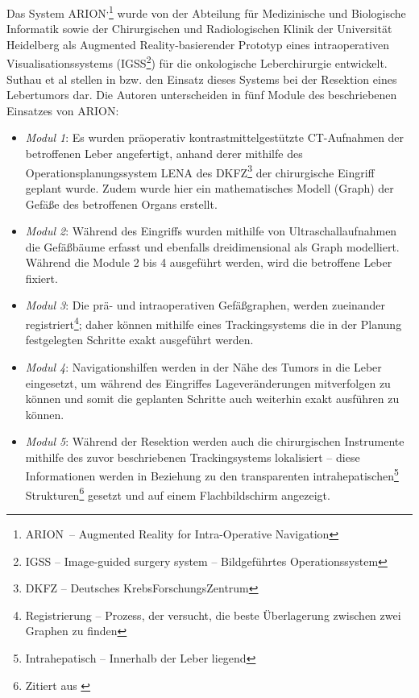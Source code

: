 \documentclass[ngerman,pdftex,paper=A4,DIV=calc,titlepage,12pt]{scrartcl}
\newtheorem[L]{boxedDefinition}{Definition}
\begin{document}
Das System ARION\texttrademark\textsuperscript{,}\footnote{ARION\texttrademark\ -- Augmented Reality for Intra-Operative Navigation} wurde von der Abteilung für Medizinische und Biologische Informatik sowie der Chirurgischen und Radiologischen Klinik der Universität Heidelberg als Augmented Reality-basierender Prototyp eines intraoperativen Visualisationssystems (IGSS\footnote{IGSS -- Image-guided surgery system -- Bildgeführtes Operationssystem}) für die onkologische Leberchirurgie entwickelt. Suthau et al stellen in \cite{Suthau2002DE} bzw. \cite{Suthau2002} den Einsatz dieses Systems bei der Resektion eines Lebertumors dar. Die Autoren unterscheiden in \cite{Suthau2002DE} fünf Module des beschriebenen Einsatzes von ARION\texttrademark:
\begin{itemize}
 \item \textit{Modul 1}: Es wurden präoperativ kontrastmittelgestützte CT-Aufnahmen der betroffenen Leber angefertigt, anhand derer mithilfe des Operationsplanungssystem LENA des DKFZ\footnote{DKFZ -- Deutsches KrebsForschungsZentrum} der chirurgische Eingriff geplant wurde. Zudem wurde hier ein mathematisches Modell (Graph) der Gefäße des betroffenen Organs erstellt.
 \item \textit{Modul 2}: Während des Eingriffs wurden mithilfe von Ultraschallaufnahmen die Gefäßbäume erfasst und ebenfalls dreidimensional als Graph modelliert. Während die Module 2 bis 4 ausgeführt werden, wird die betroffene Leber fixiert.
 \item \textit{Modul 3}: Die prä- und intraoperativen Gefäßgraphen, werden 
zueinander registriert\footnote{Registrierung -- Prozess, der versucht, die beste Überlagerung zwischen zwei Graphen zu finden}; daher können mithilfe eines Trackingsystems die in der Planung festgelegten Schritte exakt ausgeführt werden.
 \item \textit{Modul 4}: Navigationshilfen werden in der Nähe des Tumors in die Leber eingesetzt, um während des Eingriffes Lageveränderungen mitverfolgen zu können und somit die geplanten Schritte auch weiterhin exakt ausführen zu können.
 \item \textit{Modul 5}: Während der Resektion werden auch die chirurgischen Instrumente mithilfe des zuvor beschriebenen Trackingsystems lokalisiert -- diese Informationen werden \glqq in Beziehung zu den transparenten intrahepatischen\footnote{Intrahepatisch -- Innerhalb der Leber liegend} Strukturen\grqq\footnote{Zitiert aus \cite[Kapitel 2, Seite 3]{Suthau2002DE}} gesetzt und auf einem Flachbildschirm angezeigt.
\end{itemize}
\end{document}
